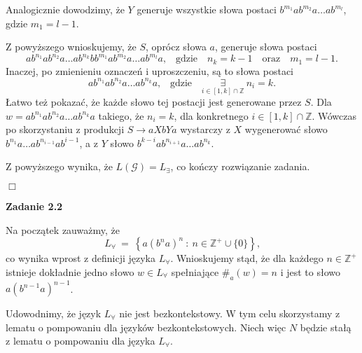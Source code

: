 \documentclass[12pt]{article}
\begin{document}
	\medskip
	
	Analogicznie dowodzimy, że \(Y\) generuje wszystkie słowa postaci
	\(b^{m_{1}} a b^{m_{2}} a \ldots a b^{m_{l}}\), gdzie \(m_{1} = l - 1\).
	
	\medskip
	
	Z powyższego wnioskujemy, że \(S\), oprócz słowa \(a\), generuje słowa
	postaci
	\[ a b^{n_{1}} a b^{n_{2}} a \ldots a b^{n_{k}} b b^{m_{1}} a b^{m_{2}} a
	\ldots a b^{m_{l}} a \text{,} \quad \text{gdzie} \quad n_{k} = k - 1 \quad
	\text{oraz} \quad m_{1} = l - 1 \text{.} \]
	Inaczej, po zmienieniu oznaczeń i uproszczeniu, są to słowa postaci
	\[ a b^{n_{1}} a b^{n_{2}}a \ldots a b^{n_{k}} a \text{,} \quad \text{gdzie}
	\quad \underset{i \in \left[ 1, k \right] \cap \mathbb{Z}}{\exists} \ n_{i}
	= k \text{.} \]
	Łatwo też pokazać, że każde słowo tej postacji jest generowane przez \(S\).
	Dla \(w = a b^{n_{1}} a b^{n_{2}} a \ldots a b^{n_{k}} a\) takiego, że
	\(n_{i} = k\), dla konkretnego \(i \in \left[ 1, k \right] \cap
	\mathbb{Z}\). Wówczas po skorzystaniu z produkcji \(S \longrightarrow
	aXbYa\) wystarczy z \(X\) wygenerować słowo \(b^{n_{1}} a \ldots a
	b^{n_{i - 1}} a b^{i - 1}\), a z \(Y\) słowo \(b^{k - i} a b^{n_{i + 1}} a
	\ldots a b^{n_{k}}\).
	
	\medskip
	
	Z powyższego wynika, że \(L \left( \mathcal{G} \right) = L_{\exists}\), co
	kończy rozwiązanie zadania.
	\begin{flushright}
		\(\Box\)
	\end{flushright}
	
	\newpage
	
	\textbf{Zadanie 2.2}
	
	\medskip
	
	Na początek zauważmy, że
	\[ L_{\forall} \ = \ \left\{ a \left( b^{n} a \right) ^ {n} \ : \ n \in
	\mathbb{Z}^{+} \cup \{0\} \right\} \text{,} \]
	co wynika wprost z definicji języka \(L_{\forall}\). Wnioskujemy stąd, że
	dla każdego \(n \in \mathbb{Z}^{+}\) istnieje dokładnie jedno słowo \(w \in
	L_{\forall}\) spełniające \(\#_{a} \left( w \right) = n\) i jest to słowo
	\(a \left( b^{n - 1} a \right) ^ {n - 1}\).
	
	\medskip
	
	Udowodnimy, że język \(L_{\forall}\) nie jest bezkontekstowy. W tym celu
	skorzystamy z lematu o pompowaniu dla języków bezkontekstowych. Niech
	więc \(N\) będzie stałą z lematu o pompowaniu dla języka \(L_{\forall}\).
	
	\medskip
	
\end{document}
